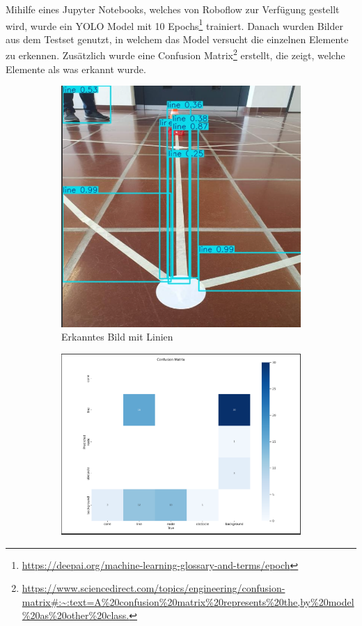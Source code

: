 Mihilfe eines Jupyter Notebooks, welches von Roboflow zur Verfügung gestellt wird, wurde ein YOLO Model mit 10 Epochs\footnote{\url{https://deepai.org/machine-learning-glossary-and-terms/epoch}} trainiert. Danach wurden Bilder aus dem Testset genutzt, in welchem das Model versucht die einzelnen Elemente zu erkennen. Zusätzlich wurde eine Confusion Matrix\footnote{\url{https://www.sciencedirect.com/topics/engineering/confusion-matrix\#:\~:text=A\%20confusion\%20matrix\%20represents\%20the,by\%20model\%20as\%20other\%20class.}} erstellt, die zeigt, welche Elemente als was erkannt wurde.

\begin{figure}[H]
\begin{subfigure}{0.3\textwidth}
\includegraphics[width=0.95\linewidth]{assets/informatik-prototyp/yolo/line-recognitions.png} 
\caption{Erkanntes Bild mit Linien}
\label{fig:image-recognition-with-lines}
\end{subfigure}
\begin{subfigure}{0.69\textwidth}
\includegraphics[width=0.95\linewidth]{assets/informatik-prototyp/yolo/conf-matrix-lines.png} 

\end{subfigure}
\end{figure}
